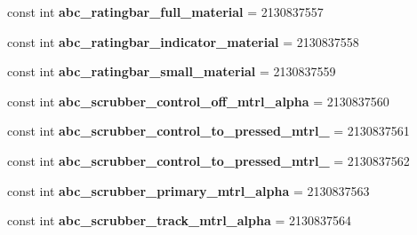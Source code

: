 \begin{DoxyCompactItemize}
const int {\bfseries abc\+\_\+ratingbar\+\_\+full\+\_\+material} = 2130837557
\item 
\mbox{\label{class_pinned_app_1_1_droid_1_1_resource_1_1_drawable_aa2c133ca1e1857e57e1204b3295bb117}} 
const int {\bfseries abc\+\_\+ratingbar\+\_\+indicator\+\_\+material} = 2130837558
\item 
\mbox{\label{class_pinned_app_1_1_droid_1_1_resource_1_1_drawable_a6c542a6d520e0ec704244163ad073255}} 
const int {\bfseries abc\+\_\+ratingbar\+\_\+small\+\_\+material} = 2130837559
\item 
\mbox{\label{class_pinned_app_1_1_droid_1_1_resource_1_1_drawable_ad8fe428ef1bf1e39e3e5e6afc6b99475}} 
const int {\bfseries abc\+\_\+scrubber\+\_\+control\+\_\+off\+\_\+mtrl\+\_\+alpha} = 2130837560
\item 
\mbox{\label{class_pinned_app_1_1_droid_1_1_resource_1_1_drawable_accdb4c8c62cefd98e2188d7e19ff8168}} 
const int {\bfseries abc\+\_\+scrubber\+\_\+control\+\_\+to\+\_\+pressed\+\_\+mtrl\+\_} = 2130837561
\item 
\mbox{\label{class_pinned_app_1_1_droid_1_1_resource_1_1_drawable_ad5fbaccbc8ff09108ffc4ad7e7eada5b}} 
const int {\bfseries abc\+\_\+scrubber\+\_\+control\+\_\+to\+\_\+pressed\+\_\+mtrl\+\_} = 2130837562
\item 
\mbox{\label{class_pinned_app_1_1_droid_1_1_resource_1_1_drawable_a8020d6f243cf5eb21907a4aa9d25042d}} 
const int {\bfseries abc\+\_\+scrubber\+\_\+primary\+\_\+mtrl\+\_\+alpha} = 2130837563
\item 
\mbox{\label{class_pinned_app_1_1_droid_1_1_resource_1_1_drawable_a7a54e1e5dc7b8cce67514f8fa7a036c9}} 
const int {\bfseries abc\+\_\+scrubber\+\_\+track\+\_\+mtrl\+\_\+alpha} = 2130837564
\item 
\mbox{\label{class_pinned_app_1_1_droid_1_1_resource_1_1_drawable_a520e2a9aa9da9a79f85377069278e8b0}} 

\end{DoxyCompactItemize}
